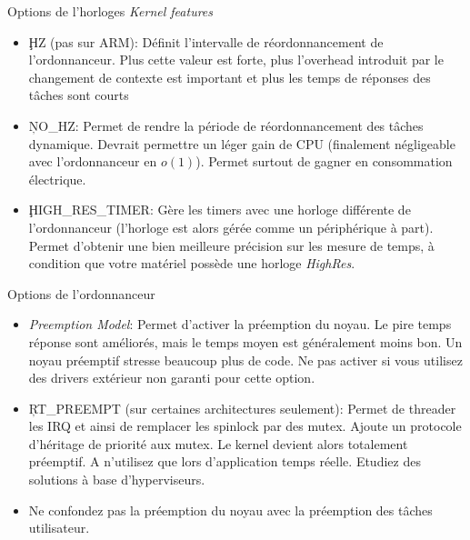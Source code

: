 \begin{frame}[fragile=singleslide]{Options de l'horloges}
  \emph{Kernel features}
  \begin{itemize} 
  \item \c{HZ} (pas sur ARM): Définit l'intervalle de réordonnancement
    de l'ordonnanceur.   Plus cette valeur est  forte, plus l'overhead
    introduit par le changement de  contexte est important et plus les
    temps de réponses des tâches sont courts
  \item \c{NO_HZ}: Permet de rendre la période de réordonnancement des
    tâches  dynamique.   Devrait  permettre  un  léger   gain  de  CPU
    (finalement  négligeable avec  l'ordonnanceur  en $o(1)$).  Permet
    surtout de gagner en consommation électrique.
  \item   \c{HIGH_RES_TIMER}:  Gère  les   timers  avec   une  horloge
    différente de  l'ordonnanceur (l'horloge  est alors gérée  comme un
    périphérique  à  part).    Permet  d'obtenir  une  bien  meilleure
    précision sur les mesure de  temps, à condition que votre matériel
    possède une horloge \emph{HighRes}.
  \end{itemize}
\end{frame}  

\begin{frame}[fragile=singleslide]{Options de l'ordonnanceur}
  \begin{itemize} 
  \item  \emph{Preemption Model}:  Permet d'activer  la  préemption du
    noyau. Le pire  temps réponse sont améliorés, mais  le temps moyen
    est généralement  moins bon.  Un noyau  préemptif stresse beaucoup
    plus  de  code.  Ne  pas  activer  si  vous utilisez  des  drivers
    extérieur non garanti pour cette option.
  \item \c{RT_PREEMPT} (sur certaines architectures seulement): Permet
    de threader  les IRQ  et ainsi de  remplacer les spinlock  par des
    mutex.  Ajoute un protocole  d'héritage de priorité aux mutex.  Le
    kernel devient alors totalement  préemptif.  A n'utilisez que lors
    d'application  temps   réelle.   Etudiez  des   solutions  à  base
    d'hyperviseurs.
  \item Ne confondez pas la préemption du noyau avec la préemption des
    tâches utilisateur.
  \end{itemize}
\end{frame}  

